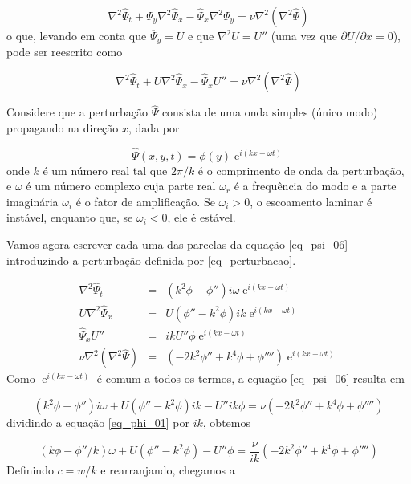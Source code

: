 \documentclass[a4paper,portuguese,10pt]{article}
\newcommand{\Y}{\hat\Psi}
\newcommand{\Yb}{\overline\Psi}
\renewcommand{\D}{\partial}
\newcommand{\e}{\operatorname{e}}
\begin{document}
\begin{equation}
  \nabla^2\Y_t+\Yb_y\nabla^2\Y_x-\Y_x\nabla^2\Yb_y=\nu\nabla^2\left(\nabla^2\Y\right)
  \label{eq_psi_05}
\end{equation}
o que, levando em conta que $\Yb_y=U$ e que $\nabla^2U = U''$ (uma vez que $\D U/\D x=0$), pode ser reescrito como

\begin{equation}
  \nabla^2\Y_t+U\nabla^2\Y_x-\Y_xU''=\nu\nabla^2\left(\nabla^2\Y\right)
  \label{eq_psi_06}
\end{equation}

Considere que a perturbação $\Y$ consista de uma onda simples (único modo) propagando na direção $x$, dada por

\begin{equation}
  \Y(x,y,t)=\phi(y)\e^{i(kx-\omega t)}
  \label{eq_perturbacao}
\end{equation}
onde $k$ é um número real tal que $2\pi/k$ é o comprimento de onda da perturbação, e $\omega$ é um número complexo cuja parte real $\omega_r$ é a frequência do modo e a parte imaginária $\omega_i$ é o fator de amplificação. Se $\omega_i>0$, o escoamento laminar é instável, enquanto que, se $\omega_i<0$, ele é estável.

Vamos agora escrever cada uma das parcelas da equação \ref{eq_psi_06} introduzindo a perturbação definida por \ref{eq_perturbacao}.

\begin{subequations}
  \begin{eqnarray}
    \nabla^2\Y_t&=&(k^2\phi-\phi'')i\omega\e^{i(kx-\omega t)}\\
    U\nabla^2\Y_x&=&U(\phi''-k^2\phi)ik\e^{i(kx-\omega t)}\\
    \Y_xU''&=&ikU''\phi\e^{i(kx-\omega t)}\\
    \nu\nabla^2(\nabla^2\Y)&=&(-2k^2\phi''+k^4\phi+\phi'''')\e^{i(kx-\omega t)}
  \end{eqnarray}
\end{subequations}
Como $\e^{i(kx-\omega t)}$ é comum a todos os termos, a equação \ref{eq_psi_06} resulta em

\begin{equation}
  (k^2\phi-\phi'')i\omega+U(\phi''-k^2\phi)ik-U''ik\phi=\nu(-2k^2\phi''+k^4\phi+\phi'''')
  \label{eq_phi_01}
\end{equation}
dividindo a equação \ref{eq_phi_01} por $ik$, obtemos

\begin{equation}
  (k\phi-\phi''/k)\omega+U(\phi''-k^2\phi)-U''\phi=\frac{\nu}{ik}(-2k^2\phi''+k^4\phi+\phi'''')
  \label{eq_phi_02}
\end{equation}
Definindo $c=w/k$ e rearranjando, chegamos a
\end{document}
